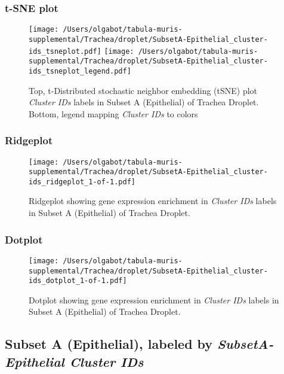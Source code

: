 \clearpage
\subsubsection{t-SNE plot}
\begin{figure}[h]
\centering
\texttt{[image: /Users/olgabot/tabula-muris-supplemental/Trachea/droplet/SubsetA-Epithelial\_cluster-ids\_tsneplot.pdf]}
\texttt{[image: /Users/olgabot/tabula-muris-supplemental/Trachea/droplet/SubsetA-Epithelial\_cluster-ids\_tsneplot\_legend.pdf]}
\caption{Top, t-Distributed stochastic neighbor embedding (tSNE) plot  \emph{Cluster IDs} labels in Subset A (Epithelial) of Trachea Droplet. Bottom, legend mapping \emph{Cluster IDs} to colors}
\end{figure}


\clearpage

\subsubsection{Ridgeplot}
\begin{figure}[h]
\centering
\texttt{[image: /Users/olgabot/tabula-muris-supplemental/Trachea/droplet/SubsetA-Epithelial\_cluster-ids\_ridgeplot\_1-of-1.pdf]}

\caption{ Ridgeplot  showing gene expression enrichment in \emph{Cluster IDs} labels in Subset A (Epithelial) of Trachea Droplet. }
\end{figure}


\clearpage

\subsubsection{Dotplot}
\begin{figure}[h]
\centering
\texttt{[image: /Users/olgabot/tabula-muris-supplemental/Trachea/droplet/SubsetA-Epithelial\_cluster-ids\_dotplot\_1-of-1.pdf]}

\caption{ Dotplot  showing gene expression enrichment in \emph{Cluster IDs} labels in Subset A (Epithelial) of Trachea Droplet. }
\end{figure}


\clearpage

\subsection{Subset A (Epithelial), labeled by \emph{SubsetA-Epithelial Cluster IDs}}
